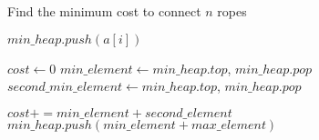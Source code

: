\documentclass[12pt]{article}
\begin{document}
\begin{algorithm}

  \caption{Find the minimum cost to connect $n$ ropes}
  
  \begin{algorithmic}[1]
    \Statex
    
            \State $min\_heap.push(a[i])$
        \EndFor
        
        \State $cost \gets 0$
            \State $min\_element \gets min\_heap.top$, $min\_heap.pop$
            \State $second\_min\_element \gets min\_heap.top$, $min\_heap.pop$
            
            \State $cost += min\_element + second\_element$
            \State $min\_heap.push(min\_element + max\_element)$
        \EndWhile
    \EndFunction
  \end{algorithmic}
  
\end{algorithm}
\end{document}

